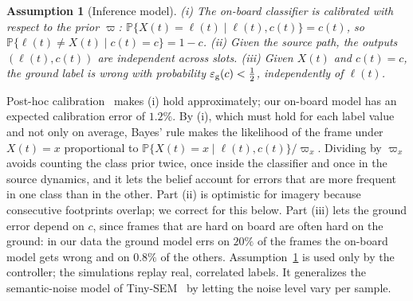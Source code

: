 \documentclass[conference]{IEEEtran}
\newtheorem{assumption}{Assumption}
\theoremstyle{remark}
\newcommand{\Prob}{\mathbb{P}}
\newcommand{\lab}{\ell}
\newcommand{\ee}{\varepsilon}
\begin{document}
\begin{assumption}[Inference model]\label{as:inf}
(i) The on-board classifier is calibrated with respect to the prior $\varpi$: $\Prob\{X(t)=\lab(t)\mid\lab(t),c(t)\}=c(t)$, so $\Prob\{\lab(t)\neq X(t)\mid c(t)=c\}=1-c$. (ii) Given the source path, the outputs $(\lab(t),c(t))$ are independent across slots. (iii) Given $X(t)$ and $c(t)=c$, the ground label is wrong with probability $\ee_{\rm g}(c)<\tfrac12$, independently of $\lab(t)$.
\end{assumption}

Post-hoc calibration~\cite{guo2017calibration} makes (i) hold approximately; our on-board model has an expected calibration error of $1.2\%$. By (i), which must hold for each label value and not only on average, Bayes' rule makes the likelihood of the frame under $X(t)=x$ proportional to $\Prob\{X(t)=x\mid\lab(t),c(t)\}/\varpi_x$. Dividing by $\varpi_x$ avoids counting the class prior twice, once inside the classifier and once in the source dynamics, and it lets the belief account for errors that are more frequent in one class than in the other. Part (ii) is optimistic for imagery because consecutive footprints overlap; we correct for this below. Part (iii) lets the ground error depend on $c$, since frames that are hard on board are often hard on the ground: in our data the ground model errs on $20\%$ of the frames the on-board model gets wrong and on $0.8\%$ of the others. Assumption~\ref{as:inf} is used only by the controller; the simulations replay real, correlated labels. It generalizes the semantic-noise model of Tiny-SEM~\cite{hosny2026tinysem} by letting the noise level vary per sample.
\end{document}
